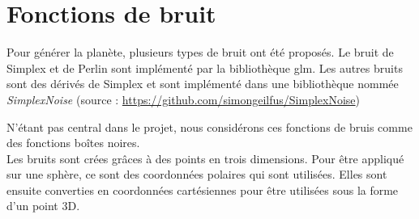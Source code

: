   \section{Fonctions de bruit}
  
  Pour générer la planète, plusieurs types de bruit ont été proposés. Le bruit de Simplex et de Perlin sont implémenté par la bibliothèque glm. Les autres bruits sont des dérivés de Simplex et sont implémenté dans une bibliothèque nommée \textit{SimplexNoise} (source : \url{https://github.com/simongeilfus/SimplexNoise})
  
  N'étant pas central dans le projet, nous considérons ces fonctions de bruis comme des fonctions boîtes noires.\\
  Les bruits sont crées grâces à des points en trois dimensions. Pour être appliqué sur une sphère, ce sont des coordonnées polaires qui sont utilisées. Elles sont ensuite converties en coordonnées cartésiennes pour être utilisées sous la forme d'un point 3D.\\

  
